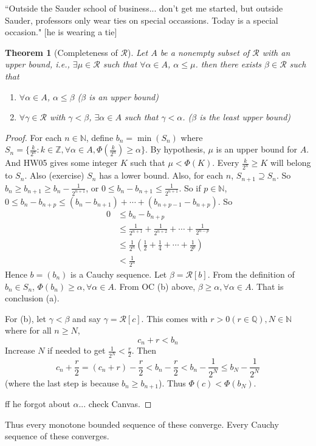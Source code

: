 \documentclass{article}
\theoremstyle{plain}
\newtheorem{theorem}{Theorem}
\theoremstyle{remark}
\newcommand{\N}{{\mathbb N}}
\newcommand{\Z}{{\mathbb Z}}
\newcommand{\Q}{{\mathbb Q}}
\newcommand{\SR}{{\mathcal R}}
\begin{document}
``Outside the Sauder school of business... don't get me started, but outside Sauder,
professors only wear ties on special occassions.
Today is a special occasion." [he is wearing a tie]
\begin{theorem}[Completeness of $\SR$]
	Let $A$ be a nonempty subset of $\SR$ with an upper bound,
	i.e., $\exists \mu \in \SR$ such that $\forall \alpha \in A$, $\alpha \leq \mu$.
	then there exists $\beta \in \SR$ such that
	\begin{enumerate}
		\item $\forall \alpha \in A$, $\alpha \leq \beta$
			($\beta$ is \emph{an} upper bound)
		\item $\forall \gamma \in \SR$ with $\gamma < \beta$,
			$\exists \alpha \in A$ such that $\gamma < \alpha$.
			($\beta$ is the \emph{least} upper bound)
	\end{enumerate}
\end{theorem}
\begin{proof}
	For each $n \in \N$, define $b_n = \min(S_n)$ where
	$S_n = \{\frac{k}{2^n} \colon k \in \Z, \forall \alpha \in A,
	\Phi(\frac{k}{2^n}) \geq \alpha\}$.
	By hypothesis, $\mu$ is an upper bound for $A$.
	And HW05 gives some integer $K$ such that $\mu < \Phi(K)$.
	Every $\frac{k}{2^n} \geq K$ will belong to $S_n$.
	Also (exercise) $S_n$ has a lower bound.
	Also, for each $n$, $S_{n+1} \supseteq S_n$.
	So $b_n \geq b_{n+1} \geq b_n - \frac{1}{2^{n+1}}$,
	or $0 \leq b_n - b_{n+1} \leq \frac{1}{2^{n+1}}$.
	So if $p \in \N$, $0 \leq b_n - b_{n+p} \leq (b_n - b_{n+1})
	+ \cdots + (b_{n+p-1} - b_{n+p})$.
	So
	\begin{align*}
		0 &\leq b_n - b_{n+p}\\
		  &\leq \frac{1}{2^{n+1}} + \frac{1}{2^{n+2}} + \cdots + \frac{1}{2^{n-p}}\\
		  &\leq \frac{1}{2^n}\left(\frac12 + \frac14 + \cdots + \frac{1}{2^p}\right)\\
		  &< \frac{1}{2^n}
	\end{align*}
	Hence $b = (b_n)$ is a Cauchy sequence.
	Let $\beta = \SR[b]$.
	From the definition of $b_n \in S_n$, $\Phi(b_n) \geq \alpha, \forall \alpha \in A$.
	From OC (b) above,
	$\beta \geq \alpha, \forall \alpha \in A$.
	That is conclusion (a).

	For (b), let $\gamma < \beta$ and say $\gamma = \SR[c]$.
	This comes with $r>0 (r\in\Q), N \in \N$ where for all $n \geq N$,
	\[
		c_n + r < b_n
	\]
	Increase $N$ if needed to get $\frac{1}{2^N} < \frac{r}{2}$.
	Then
	\[
		c_n + \frac{r}{2} = (c_n + r) - \frac{r}{2} < b_n - \frac{r}{2}
		< b_n - \frac{1}{2^N} \leq b_N - \frac{1}{2^N}
	\]
	(where the last step is because $b_n \geq b_{n+1}$).
	Thus $\Phi(c) < \Phi(b_N)$.

	ff he forgot about $\alpha$... check Canvas.
\end{proof}
Thus every monotone bounded sequence of these converge.
Every Cauchy sequence of these converges.
\end{document}
